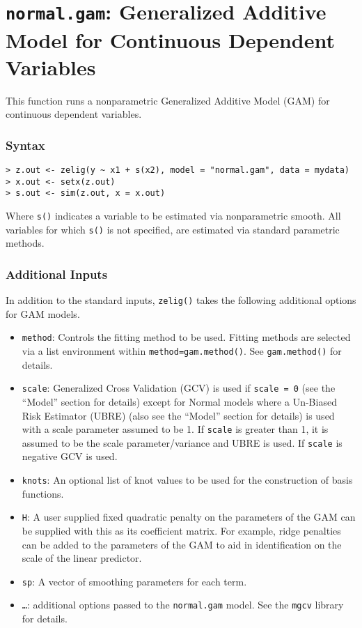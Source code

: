 
\section{{\tt normal.gam}: Generalized Additive Model for Continuous Dependent Variables}\label{gam.normal}

This function runs a nonparametric Generalized Additive Model (GAM) for continuous dependent variables. 

\subsubsection{Syntax}
\begin{verbatim}
> z.out <- zelig(y ~ x1 + s(x2), model = "normal.gam", data = mydata) 
> x.out <- setx(z.out)
> s.out <- sim(z.out, x = x.out)
\end{verbatim}
Where {\tt s()} indicates a variable to be estimated via nonparametric smooth. All variables for which  {\tt s()} is not specified, are estimated via standard parametric methods. 

\subsubsection{Additional Inputs}
In addition to the standard inputs, {\tt zelig()} takes the following additional options for GAM models.
\begin{itemize}
\item {\tt method}: Controls the fitting method to be used. Fitting methods are selected via a list environment within {\tt method=gam.method()}. See {\tt gam.method()} for details. 
\item {\tt scale}:  Generalized Cross Validation (GCV) is used if {\tt scale = 0} (see the ``Model'' section for details) except for Normal models where a Un-Biased Risk Estimator (UBRE) (also see the ``Model'' section for details) is used with a scale parameter assumed to be 1. If {\tt scale} is greater than 1, it is assumed to be the scale parameter/variance and UBRE is used. If {\tt scale} is negative GCV is used.
\item {\tt knots}: An optional list of knot values to be used for the construction of basis functions. 
\item {\tt H}: A user supplied fixed quadratic penalty on the parameters of the GAM can be supplied with this as its coefficient matrix. For example, ridge penalties can be added to the parameters of the GAM to aid in identification on the scale of the linear predictor.
\item {\tt sp}: A vector of smoothing parameters for each term.
\item {\tt \ldots}: additional options passed to the {\tt normal.gam} model. See the {\tt mgcv} library for details. 
\end{itemize}


